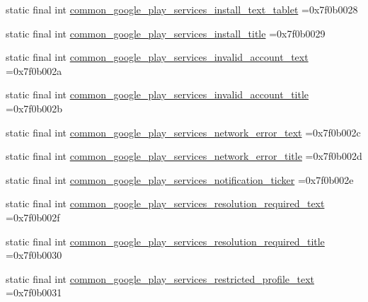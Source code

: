 \begin{DoxyCompactItemize}
\item 
static final int \mbox{\hyperlink{classbr_1_1unb_1_1cic_1_1mp_1_1marketmaster_1_1test_1_1R_1_1string_acfb8feef405a2992265a82b710573ad0}{common\+\_\+google\+\_\+play\+\_\+services\+\_\+install\+\_\+text\+\_\+tablet}} =0x7f0b0028
\item 
static final int \mbox{\hyperlink{classbr_1_1unb_1_1cic_1_1mp_1_1marketmaster_1_1test_1_1R_1_1string_a7a25d2750a7cde263ca909b72618b5de}{common\+\_\+google\+\_\+play\+\_\+services\+\_\+install\+\_\+title}} =0x7f0b0029
\item 
static final int \mbox{\hyperlink{classbr_1_1unb_1_1cic_1_1mp_1_1marketmaster_1_1test_1_1R_1_1string_af10c24c314ceb43bf5626f1ae53cf8c4}{common\+\_\+google\+\_\+play\+\_\+services\+\_\+invalid\+\_\+account\+\_\+text}} =0x7f0b002a
\item 
static final int \mbox{\hyperlink{classbr_1_1unb_1_1cic_1_1mp_1_1marketmaster_1_1test_1_1R_1_1string_a5405662cec5489862c10537c69260c33}{common\+\_\+google\+\_\+play\+\_\+services\+\_\+invalid\+\_\+account\+\_\+title}} =0x7f0b002b
\item 
static final int \mbox{\hyperlink{classbr_1_1unb_1_1cic_1_1mp_1_1marketmaster_1_1test_1_1R_1_1string_a17cd9368880475dcf52910cb2c7fad1b}{common\+\_\+google\+\_\+play\+\_\+services\+\_\+network\+\_\+error\+\_\+text}} =0x7f0b002c
\item 
static final int \mbox{\hyperlink{classbr_1_1unb_1_1cic_1_1mp_1_1marketmaster_1_1test_1_1R_1_1string_a0fb74883ce140b0259c0237fe98f9c88}{common\+\_\+google\+\_\+play\+\_\+services\+\_\+network\+\_\+error\+\_\+title}} =0x7f0b002d
\item 
static final int \mbox{\hyperlink{classbr_1_1unb_1_1cic_1_1mp_1_1marketmaster_1_1test_1_1R_1_1string_a9cecef9b72d3fdb314e54d3ff6749802}{common\+\_\+google\+\_\+play\+\_\+services\+\_\+notification\+\_\+ticker}} =0x7f0b002e
\item 
static final int \mbox{\hyperlink{classbr_1_1unb_1_1cic_1_1mp_1_1marketmaster_1_1test_1_1R_1_1string_a4d2d14a03f5535f63eb4308e1f53b075}{common\+\_\+google\+\_\+play\+\_\+services\+\_\+resolution\+\_\+required\+\_\+text}} =0x7f0b002f
\item 
static final int \mbox{\hyperlink{classbr_1_1unb_1_1cic_1_1mp_1_1marketmaster_1_1test_1_1R_1_1string_aee6485afdfb79e10e6cb5530def4a3bb}{common\+\_\+google\+\_\+play\+\_\+services\+\_\+resolution\+\_\+required\+\_\+title}} =0x7f0b0030
\item 
static final int \mbox{\hyperlink{classbr_1_1unb_1_1cic_1_1mp_1_1marketmaster_1_1test_1_1R_1_1string_ad9e5f7ce25547a32e57a57062c199934}{common\+\_\+google\+\_\+play\+\_\+services\+\_\+restricted\+\_\+profile\+\_\+text}} =0x7f0b0031

\end{DoxyCompactItemize}
